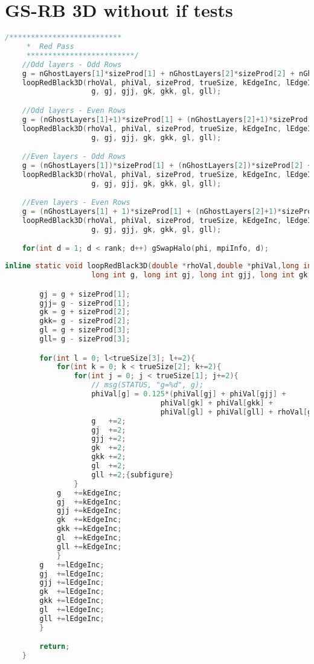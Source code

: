 	\section{GS-RB 3D without if tests}
	\begin{lstlisting}[language=c, caption = main routine]
	/**************************
	 *	Red Pass
	 *************************/
	//Odd layers - Odd Rows
	g = nGhostLayers[1]*sizeProd[1] + nGhostLayers[2]*sizeProd[2] + nGhostLayers[3]*sizeProd[3];
	loopRedBlack3D(rhoVal, phiVal, sizeProd, trueSize, kEdgeInc, lEdgeInc,
					g, gj, gjj, gk, gkk, gl, gll);

	//Odd layers - Even Rows
	g = (nGhostLayers[1]+1)*sizeProd[1] + (nGhostLayers[2]+1)*sizeProd[2] + nGhostLayers[3]*sizeProd[3];
	loopRedBlack3D(rhoVal, phiVal, sizeProd, trueSize, kEdgeInc, lEdgeInc,
					g, gj, gjj, gk, gkk, gl, gll);

	//Even layers - Odd Rows
	g = (nGhostLayers[1])*sizeProd[1] + (nGhostLayers[2])*sizeProd[2] + (nGhostLayers[3]+1)*sizeProd[3];
	loopRedBlack3D(rhoVal, phiVal, sizeProd, trueSize, kEdgeInc, lEdgeInc,
					g, gj, gjj, gk, gkk, gl, gll);

	//Even layers - Even Rows
	g = (nGhostLayers[1] + 1)*sizeProd[1] + (nGhostLayers[2]+1)*sizeProd[2] + (nGhostLayers[3]+1)*sizeProd[3];
	loopRedBlack3D(rhoVal, phiVal, sizeProd, trueSize, kEdgeInc, lEdgeInc,
					g, gj, gjj, gk, gkk, gl, gll);

	for(int d = 1; d < rank; d++) gSwapHalo(phi, mpiInfo, d);
	\end{lstlisting}

	\begin{lstlisting}[language=c, caption = loop routine]
		inline static void loopRedBlack3D(double *rhoVal,double *phiVal,long int *sizeProd, int *trueSize, int kEdgeInc, int lEdgeInc,
					long int g, long int gj, long int gjj, long int gk, long int gkk, long int gl, long int gll){

		gj = g + sizeProd[1];
		gjj= g - sizeProd[1];
		gk = g + sizeProd[2];
		gkk= g - sizeProd[2];
		gl = g + sizeProd[3];
		gll= g - sizeProd[3];

		for(int l = 0; l<trueSize[3]; l+=2){
			for(int k = 0; k < trueSize[2]; k+=2){
				for(int j = 0; j < trueSize[1]; j+=2){
					// msg(STATUS, "g=%d", g);
					phiVal[g] = 0.125*(phiVal[gj] + phiVal[gjj] +
									phiVal[gk] + phiVal[gkk] +
									phiVal[gl] + phiVal[gll] + rhoVal[g]);
					g	+=2;
					gj	+=2;
					gjj	+=2;
					gk	+=2;
					gkk	+=2;
					gl	+=2;
					gll	+=2;{subfigure}
				}
			g	+=kEdgeInc;
			gj	+=kEdgeInc;
			gjj	+=kEdgeInc;
			gk	+=kEdgeInc;
			gkk	+=kEdgeInc;
			gl	+=kEdgeInc;
			gll	+=kEdgeInc;
			}
		g	+=lEdgeInc;
		gj	+=lEdgeInc;
		gjj	+=lEdgeInc;
		gk	+=lEdgeInc;
		gkk	+=lEdgeInc;
		gl	+=lEdgeInc;
		gll	+=lEdgeInc;
		}

		return;
	}

	\end{lstlisting}
